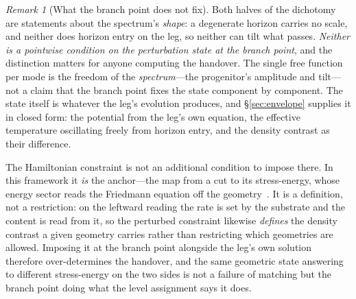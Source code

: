 \documentclass[11pt,a4paper]{article}
\theoremstyle{plain}
\theoremstyle{definition}
\theoremstyle{remark}
\newtheorem{remark}{Remark}
\begin{document}
\begin{remark}[What the branch point does not fix]\label{rem:branchpoint-not-a-condition}
Both halves of the dichotomy are statements about the spectrum's \emph{shape}: a degenerate horizon carries no
scale, and neither does horizon entry on the leg, so neither can tilt what passes. \emph{Neither is a pointwise
condition on the perturbation state at the branch point}, and the distinction matters for anyone computing the
handover. The single free function per mode is the freedom of the \emph{spectrum}---the progenitor's amplitude
and tilt---not a claim that the branch point fixes the state component by component. The state itself is whatever the
leg's evolution produces, and \S\ref{sec:envelope} supplies it in closed form: the potential from the leg's own
equation, the effective temperature oscillating freely from horizon entry, and the density contrast as their
difference.

The Hamiltonian constraint is not an additional condition to impose there. In this framework it \emph{is} the
anchor---the map from a cut to its stress-energy, whose energy sector reads the Friedmann equation off the
geometry~\cite{JanzenOperator,JanzenRange}. It is a definition, not a restriction: on the leftward reading the
rate is set by the substrate and the content is read from it, so the perturbed constraint likewise \emph{defines}
the density contrast a given geometry carries rather than restricting which geometries are allowed. Imposing it
at the branch point alongside the leg's own solution therefore over-determines the handover, and the same geometric
state answering to different stress-energy on the two sides is not a failure of matching but the branch point doing
what the level assignment says it does.
\end{remark}
\end{document}
